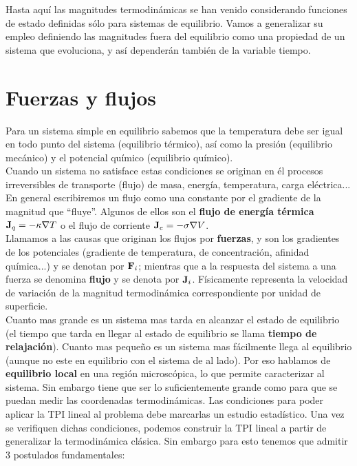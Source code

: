 \documentclass[12pt]{book}
\begin{document}
 Hasta aquí las magnitudes termodinámicas se han venido considerando funciones de estado definidas sólo para sistemas de equilibrio. Vamos a generalizar su empleo definiendo las magnitudes fuera del equilibrio como una propiedad de un sistema que evoluciona, y así dependerán también de la variable tiempo.
 
\section{Fuerzas y flujos}

Para un sistema simple en equilibrio sabemos que la temperatura debe ser igual en todo punto del sistema (equilibrio térmico), así como la presión (equilibrio mecánico) y el potencial químico (equilibrio químico). \\

Cuando un sistema no satisface estas condiciones se originan en él procesos irreversibles de transporte (flujo) de masa, energía, temperatura, carga eléctrica... En general escribiremos un flujo como una constante por el gradiente de la magnitud que ``fluye''. Algunos de ellos son el \textbf{flujo de energía térmica} $\textbf{J}_q = - \kappa \nabla T$ o el flujo de corriente $\textbf{J}_e = - \sigma  \nabla V$. \\

Llamamos a las causas que originan los flujos por \textbf{fuerzas}, y son los gradientes de los potenciales (gradiente de temperatura, de concentración, afinidad química...) y se denotan por $\textbf{F}_i$; mientras que a la respuesta del sistema a una fuerza se denomina \textbf{flujo} y se denota por $\textbf{J}_i$. Físicamente representa la velocidad de variación de la magnitud termodinámica correspondiente por unidad de superficie. \\

Cuanto mas grande es un sistema mas tarda en alcanzar el estado de equilibrio (el tiempo que tarda en llegar al estado de equilibrio se llama \textbf{tiempo de relajación}). Cuanto mas pequeño es un sistema mas fácilmente llega al equilibrio (aunque no este en equilibrio con el sistema de al lado). Por eso hablamos de \textbf{equilibrio local} en una región microscópica, lo que permite caracterizar al sistema. Sin embargo tiene que ser lo suficientemente grande como para que se puedan medir las coordenadas termodinámicas. Las condiciones para poder aplicar la TPI lineal al problema debe marcarlas un estudio estadístico. Una vez se verifiquen dichas condiciones, podemos construir la TPI lineal a partir de generalizar la termodinámica clásica. Sin embargo para esto tenemos que admitir 3 postulados fundamentales:
\end{document}
